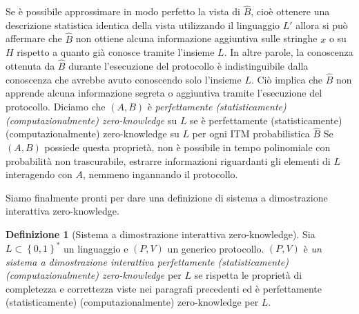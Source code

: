 \documentclass{article}
\theoremstyle{definition}
\newtheorem{definizione}{Definizione}
\begin{document}
Se è possibile approssimare in modo perfetto la vista di $\hat{B}$, cioè ottenere una descrizione statistica identica della vista utilizzando il linguaggio $L'$ allora si può affermare che $\hat{B}$ non ottiene alcuna informazione aggiuntiva sulle stringhe $x$ o su $H$ rispetto a quanto già conosce tramite l'insieme $L$. In altre parole, la conoscenza ottenuta da $\hat{B}$ durante l'esecuzione del protocollo è indistinguibile dalla conoscenza che avrebbe avuto conoscendo solo l'insieme $L$. Ciò implica che $\hat{B}$ non apprende alcuna informazione segreta o aggiuntiva tramite l'esecuzione del protocollo.
Diciamo che $(A,B)$ è \emph{perfettamente (statisticamente) (computazionalmente) zero-knowledge} su $L$ se è perfettamente (statisticamente) (computazionalmente) zero-knowledge su $L$ per ogni ITM probabilistica $\hat{B}$ 
Se $(A,B)$ possiede questa proprietà, non è possibile in tempo polinomiale con probabilità non trascurabile, estrarre informazioni riguardanti gli elementi di $L$ interagendo con $A$, nemmeno ingannando il protocollo.
 
Siamo finalmente pronti per dare una definizione di sistema a dimostrazione interattiva zero-knowledge.

\begin{definizione}[Sistema a dimostrazione interattiva zero-knowledge]
    Sia $L \subset \left\{ 0,1 \right\}^*$ un linguaggio e $(P, V)$ un generico protocollo. $(P, V)$ è \emph{un sistema a dimostrazione interattiva perfettamente (statisticamente) (computazionalmente) zero-knowledge} per $L$ se rispetta le proprietà di completezza e correttezza viste nei paragrafi precedenti ed è perfettamente (statisticamente) (computazionalmente) zero-knowledge per $L$.
\end{definizione}
\end{document}
